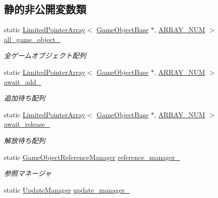 \subsection*{静的非公開変数類}
\begin{DoxyCompactItemize}
\item 
static \mbox{\hyperlink{class_limited_pointer_array}{Limited\+Pointer\+Array}}$<$ \mbox{\hyperlink{class_game_object_base}{Game\+Object\+Base}} $\ast$, \mbox{\hyperlink{class_game_object_manager_a591934d64d750c10c03c908371470681}{A\+R\+R\+A\+Y\+\_\+\+N\+UM}} $>$ \mbox{\hyperlink{class_game_object_manager_aeaf98831f542f93db15c54a4948d6331}{all\+\_\+game\+\_\+object\+\_\+}}
\begin{DoxyCompactList}\small\item\em 全ゲームオブジェクト配列 \end{DoxyCompactList}\item 
static \mbox{\hyperlink{class_limited_pointer_array}{Limited\+Pointer\+Array}}$<$ \mbox{\hyperlink{class_game_object_base}{Game\+Object\+Base}} $\ast$, \mbox{\hyperlink{class_game_object_manager_a591934d64d750c10c03c908371470681}{A\+R\+R\+A\+Y\+\_\+\+N\+UM}} $>$ \mbox{\hyperlink{class_game_object_manager_ac63518100cbdf391f137d277276e7824}{await\+\_\+add\+\_\+}}
\begin{DoxyCompactList}\small\item\em 追加待ち配列 \end{DoxyCompactList}\item 
static \mbox{\hyperlink{class_limited_pointer_array}{Limited\+Pointer\+Array}}$<$ \mbox{\hyperlink{class_game_object_base}{Game\+Object\+Base}} $\ast$, \mbox{\hyperlink{class_game_object_manager_a591934d64d750c10c03c908371470681}{A\+R\+R\+A\+Y\+\_\+\+N\+UM}} $>$ \mbox{\hyperlink{class_game_object_manager_aa5dbfcf8c724e1e21279ff9b1bc9fcbe}{await\+\_\+release\+\_\+}}
\begin{DoxyCompactList}\small\item\em 解放待ち配列 \end{DoxyCompactList}\item 
static \mbox{\hyperlink{class_game_object_reference_manager}{Game\+Object\+Reference\+Manager}} \mbox{\hyperlink{class_game_object_manager_a7346dd916f897462898a1b28c03cd466}{reference\+\_\+manager\+\_\+}}
\begin{DoxyCompactList}\small\item\em 参照マネージャ \end{DoxyCompactList}\item 
static \mbox{\hyperlink{class_update_manager}{Update\+Manager}} \mbox{\hyperlink{class_game_object_manager_a330c1759e1a075fb257a01c6f48cf9f3}{update\+\_\+manager\+\_\+}}

\end{DoxyCompactItemize}
